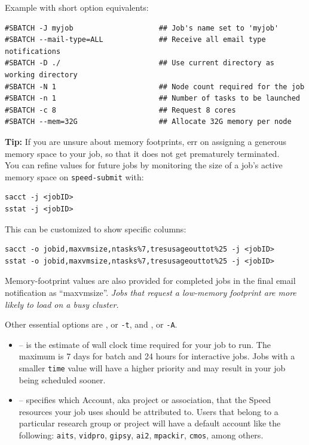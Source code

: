 \noindent Example with short option equivalents:
\begin{verbatim}
#SBATCH -J myjob                    ## Job's name set to 'myjob'
#SBATCH --mail-type=ALL             ## Receive all email type notifications
#SBATCH -D ./                       ## Use current directory as working directory
#SBATCH -N 1                        ## Node count required for the job
#SBATCH -n 1                        ## Number of tasks to be launched
#SBATCH -c 8                        ## Request 8 cores
#SBATCH --mem=32G                   ## Allocate 32G memory per node 
\end{verbatim}

%
\noindent\textbf{Tip:} If you are unsure about memory footprints, err on assigning a generous
memory space to your job, so that it does not get prematurely terminated.\\

\noindent You can refine
values for future jobs by monitoring the size of a job's active
memory space on \texttt{speed-submit} with:


\begin{verbatim}
sacct -j <jobID>
sstat -j <jobID>
\end{verbatim}

\noindent This can be customized to show specific columns:

\begin{verbatim}
sacct -o jobid,maxvmsize,ntasks%7,tresusageouttot%25 -j <jobID>
sstat -o jobid,maxvmsize,ntasks%7,tresusageouttot%25 -j <jobID>
\end{verbatim}

\noindent Memory-footprint values are also provided for completed jobs in the final
email notification as ``maxvmsize''.
%
\emph{Jobs that request a low-memory footprint are more likely to load on a busy
cluster.}

\noindent Other essential options are , or \verb|-t|, and , or \verb|-A|.
%
\begin{itemize}
\item
{} -- is the estimate of wall clock time required for your job to run. 
The maximum is 7 days for batch and 24 hours for interactive jobs. 
Jobs with a smaller \texttt{time} value will have a higher priority and may result in your job being scheduled sooner. 

\item
{} -- specifies which Account, aka project or association, 
that the Speed resources your job uses should be attributed to. Users that belong to 
a particular research group or project will have a default account like the following: 
\texttt{aits},
\texttt{vidpro},
\texttt{gipsy},
\texttt{ai2},
\texttt{mpackir},
\texttt{cmos}, among others.

\end{itemize}